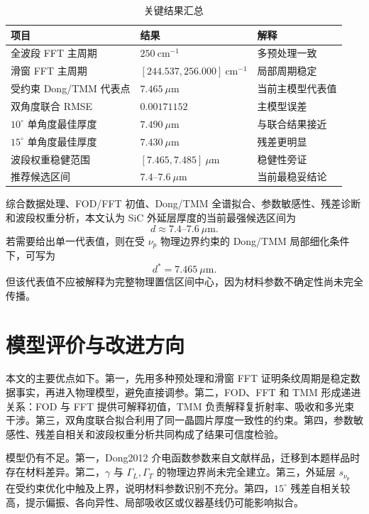 \documentclass[UTF8,a4paper,12pt]{ctexart}
\newcommand{\um}{\ensuremath{\mu\mathrm{m}}}
\newcommand{\cmone}{\ensuremath{\mathrm{cm}^{-1}}}
\begin{document}
\begin{table}[H]
\centering
\caption{关键结果汇总}
\label{tab:summary}
\begin{tabular}{lll}
\toprule
项目 & 结果 & 解释\\
\midrule
全波段 FFT 主周期 & $250\ \cmone$ & 多预处理一致\\
滑窗 FFT 主周期 & $[244.537,256.000]\ \cmone$ & 局部周期稳定\\
受约束 Dong/TMM 代表点 & $7.465\ \um$ & 当前主模型代表值\\
双角度联合 RMSE & $0.00171152$ & 主模型误差\\
$10^\circ$ 单角度最佳厚度 & $7.490\ \um$ & 与联合结果接近\\
$15^\circ$ 单角度最佳厚度 & $7.430\ \um$ & 残差更明显\\
波段权重稳健范围 & $[7.465,7.485]\ \um$ & 稳健性旁证\\
推荐候选区间 & $7.4\text{--}7.6\ \um$ & 当前最稳妥结论\\
\bottomrule
\end{tabular}
\end{table}

综合数据处理、FOD/FFT 初值、Dong/TMM 全谱拟合、参数敏感性、残差诊断和波段权重分析，本文认为 SiC 外延层厚度的当前最强候选区间为
\begin{equation}
\boxed{
d\approx7.4\text{--}7.6\ \um
}.
\end{equation}
若需要给出单一代表值，则在受 $\nu_p$ 物理边界约束的 Dong/TMM 局部细化条件下，可写为
\begin{equation}
\boxed{
d^\ast=7.465\ \um
}.
\end{equation}
但该代表值不应被解释为完整物理置信区间中心，因为材料参数不确定性尚未完全传播。

\section{模型评价与改进方向}

本文的主要优点如下。第一，先用多种预处理和滑窗 FFT 证明条纹周期是稳定数据事实，再进入物理模型，避免直接调参。第二，FOD、FFT 和 TMM 形成递进关系：FOD 与 FFT 提供可解释初值，TMM 负责解释复折射率、吸收和多光束干涉。第三，双角度联合拟合利用了同一晶圆片厚度一致性的约束。第四，参数敏感性、残差自相关和波段权重分析共同构成了结果可信度检验。

模型仍有不足。第一，Dong2012 介电函数参数来自文献样品，迁移到本题样品时存在材料差异。第二，$\gamma$ 与 $\Gamma_L,\Gamma_T$ 的物理边界尚未完全建立。第三，外延层 $s_{\nu_p}$ 在受约束优化中触及上界，说明材料参数识别不充分。第四，$15^\circ$ 残差自相关较高，提示偏振、各向异性、局部吸收区或仪器基线仍可能影响拟合。
\end{document}
